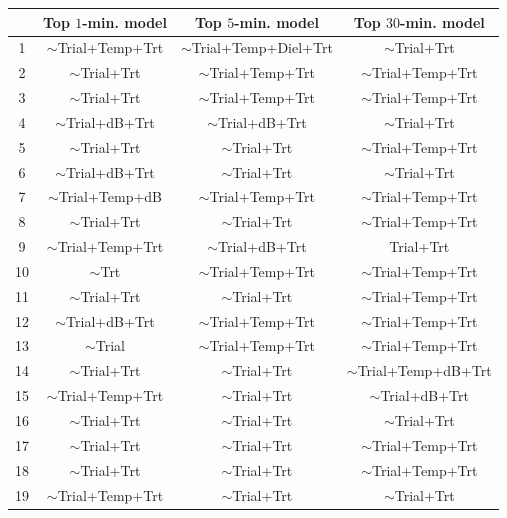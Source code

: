 \documentclass[12pt]{article}
\begin{document}
	\begin{table}[H]
		\centering
		\begin{tabular}{|c|c|c|c|}
			\hline
			\thead{Repetition} & \thead{Top $1$-min. \\ model} & \thead{Top $5$-min. \\ model} & \thead{Top $30$-min. \\ model} \\
			\hline
			1 & $\sim$Trial+Temp+Trt & $\sim$Trial+Temp+Diel+Trt & $\sim$Trial+Trt \\
			\hline
			2 & $\sim$Trial+Trt & $\sim$Trial+Temp+Trt & $\sim$Trial+Temp+Trt \\
			\hline
			3 & $\sim$Trial+Trt & $\sim$Trial+Temp+Trt & $\sim$Trial+Temp+Trt \\
			\hline
			4 & $\sim$Trial+dB+Trt & $\sim$Trial+dB+Trt & $\sim$Trial+Trt \\
			\hline
			5 & $\sim$Trial+Trt & $\sim$Trial+Trt & $\sim$Trial+Temp+Trt \\
			\hline
			6 & $\sim$Trial+dB+Trt & $\sim$Trial+Trt & $\sim$Trial+Trt \\
			\hline
			7 & $\sim$Trial+Temp+dB & $\sim$Trial+Temp+Trt & $\sim$Trial+Temp+Trt \\
			\hline
			8 & $\sim$Trial+Trt & $\sim$Trial+Trt & $\sim$Trial+Temp+Trt \\
			\hline
			9 & $\sim$Trial+Temp+Trt & $\sim$Trial+dB+Trt & Trial+Trt \\
			\hline
			10 & $\sim$Trt & $\sim$Trial+Temp+Trt & $\sim$Trial+Temp+Trt \\
			\hline
			11 & $\sim$Trial+Trt & $\sim$Trial+Trt & $\sim$Trial+Temp+Trt \\
			\hline
			12 & $\sim$Trial+dB+Trt & $\sim$Trial+Temp+Trt & $\sim$Trial+Temp+Trt \\
			\hline
			13 & $\sim$Trial & $\sim$Trial+Temp+Trt & $\sim$Trial+Temp+Trt \\
			\hline
			14 & $\sim$Trial+Trt & $\sim$Trial+Trt & $\sim$Trial+Temp+dB+Trt \\
			\hline
			15 & $\sim$Trial+Temp+Trt & $\sim$Trial+Trt & $\sim$Trial+dB+Trt \\
			\hline
			16 & $\sim$Trial+Trt & $\sim$Trial+Trt & $\sim$Trial+Trt \\
			\hline
			17 & $\sim$Trial+Trt & $\sim$Trial+Trt & $\sim$Trial+Temp+Trt \\
			\hline
			18 & $\sim$Trial+Trt & $\sim$Trial+Trt & $\sim$Trial+Temp+Trt \\
			\hline
			19 & $\sim$Trial+Temp+Trt & $\sim$Trial+Trt & $\sim$Trial+Trt \\

\end{tabular}
\end{table}
\end{document}
